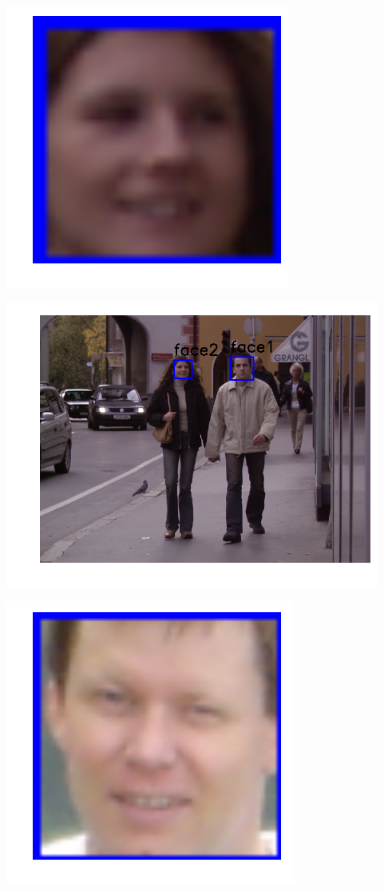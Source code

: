 \includegraphics{facedetection_files/facedetection_59_3.png}

\includegraphics{facedetection_files/facedetection_59_4.png}

\includegraphics{facedetection_files/facedetection_59_5.png}

